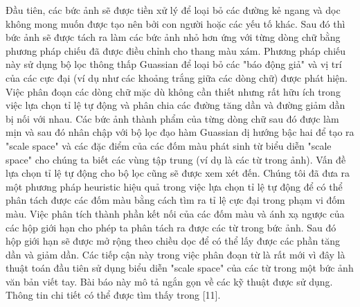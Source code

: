 \documentclass[a4paper]{article}
\begin{document}
Đầu tiên, các bức ảnh sẽ được tiền xử lý để loại bỏ các đường kẻ ngang và dọc không mong muốn được tạo nên bởi con người hoặc các yếu tố khác. Sau đó thì bức ảnh sẽ được tách ra làm các bức ảnh nhỏ hơn ứng với từng dòng chữ bằng phương pháp chiếu đã được điều chỉnh cho thang màu xám. Phương pháp chiếu này sử dụng bộ lọc thông thấp Guassian để loại bỏ các "báo động giả" và vị trí của các cực đại (ví dụ như các khoảng trắng giữa các dòng chữ) được phát hiện. Việc phân đoạn các dòng chữ mặc dù không cần thiết nhưng rất hữu ích trong việc lựa chọn tỉ lệ tự động và phân chia các đường tăng dần và đường giảm dần bị nối với nhau. Các bức ảnh thành phẩm của từng dòng chữ sau đó được làm mịn và sau đó nhân chập với bộ lọc đạo hàm Guassian dị hướng bậc hai để tạo ra "scale space" và các đặc điểm của các đốm màu phát sinh từ biểu diễn "scale space" cho chúng ta biết các vùng tập trung (ví dụ là các từ trong ảnh). Vấn đề lựa chọn tỉ lệ tự động cho bộ lọc cũng sẽ được xem xét đến. Chúng tôi đã đưa ra một phương pháp heuristic hiệu quả trong việc lựa chọn tỉ lệ tự động để có thể phân tách được các đốm màu bằng cách tìm ra tỉ lệ cực đại trong phạm vi đốm màu. Việc phân tích thành phần kết nối của các đốm màu và ánh xạ ngược của các hộp giới hạn cho phép ta phân tách ra được các từ trong bức ảnh. Sau đó hộp giới hạn sẽ được mở rộng theo chiều dọc để có thể lấy được các phần tăng dần và giảm dần. Các tiếp cận này trong việc phân đoạn từ là rất mới vì đây là thuật toán đầu tiên sử dụng biểu diễn "scale space" của các từ trong một bức ảnh văn bản viết tay. Bài báo này mô tả ngắn gọn về các kỹ thuật được sử dụng. Thông tin chi tiết có thể được tìm thấy trong [11].
\end{document}
